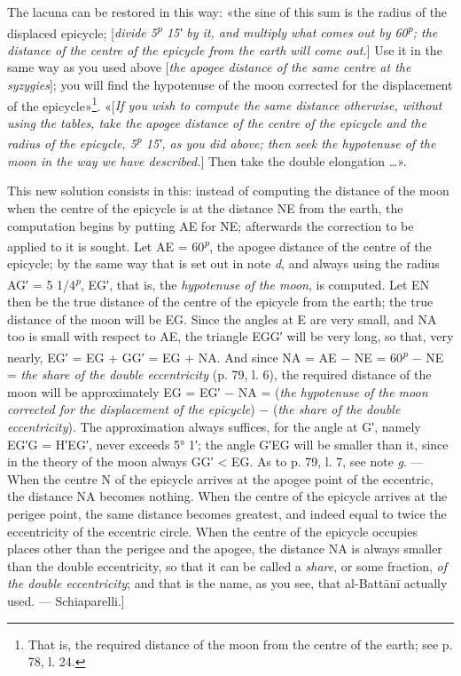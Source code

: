 \documentclass[11pt]{article}
\newcommand{\Pg}[1]{\marginpar{\footnotesize\color{gray}#1}}
\begin{document}
\par \Pg{I 255}The lacuna can be restored in this way: «the sine of this sum is the radius of the displaced epicycle; [\emph{divide 5\textsuperscript{\itshape p} 15′ by it, and multiply what comes out by 60\textsuperscript{\itshape p}; the distance of the centre of the epicycle from the earth will come out.}] Use it in the same way as you used above [\emph{the apogee distance of the same centre at the syzygies}]; you will find the hypotenuse of the moon corrected for the displacement of the epicycle»\footnote{That is, the required distance of the moon from the centre of the earth; see p. 78, l. 24.}. «[\emph{If you wish to compute the same distance otherwise, without using the tables, take the apogee distance of the centre of the epicycle and the radius of the epicycle, 5\textsuperscript{\itshape p} 15′, as you did above; then seek the hypotenuse of the moon in the way we have described.}] Then take the double elongation …».\par
\begin{center}\end{center}
\par This new solution consists in this: instead of computing the distance of the moon when the centre of the epicycle is at the distance NE from the earth, the computation begins by putting AE for NE; afterwards the correction to be applied to it is sought. Let AE = 60\textsuperscript{\itshape p}, the apogee distance of the centre of the epicycle; by the same way that is set out in note \emph{d}, and always using the radius AG′ = 5 1/4\textsuperscript{\itshape p}, EG′, that is, the \emph{hypotenuse of the moon}, is computed. Let EN then be the true distance of the centre of the epicycle from the earth; the true distance of the moon will be EG. Since the angles at E are very small, and NA too is small with respect to AE, the triangle EGG′ will be very long, so that, very nearly, EG′ = EG + GG′ = EG + NA. And since NA = AE − NE = 60\textsuperscript{\itshape p} − NE = \emph{the share of the double eccentricity} (p. 79, l. 6), the required distance of the moon will be approximately EG = EG′ − NA = (\emph{the hypotenuse of the moon corrected for the displacement of the epicycle}) − (\emph{the share of the double eccentricity}). The approximation always suffices, for the angle at G′, namely EG′G = H′EG′, never exceeds 5° 1′; the angle G′EG will be smaller than it, since in the theory of the moon always GG′ < EG. As to p. 79, l. 7, see note \emph{g}. — When the centre N of the epicycle arrives at the apogee point of the eccentric, the distance NA becomes nothing. When the centre of the epicycle arrives at the perigee point, the same distance becomes greatest, and indeed equal to twice the eccentricity of the eccentric circle. When the centre of the epicycle occupies places other than the perigee and the apogee, the distance NA is always smaller than the double eccentricity, so that it can be called a \emph{share}, or some fraction, \emph{of the double eccentricity}; and that is the name, as you see, that al-Battānī actually used. — Schiaparelli.]\par
\end{document}

